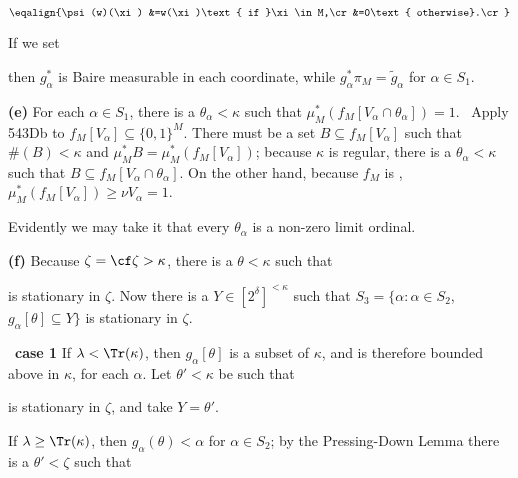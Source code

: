 {$$\eqalign{\psi(w)(\xi)
&=w(\xi)\text{ if }\xi\in M,\cr
&=0\text{ otherwise}.\cr}$$

\noindent If we set


\noindent then $g^*_{\alpha}$ is Baire measurable in each coordinate, while
$g^*_{\alpha}\pi_M=\tilde g_{\alpha}$ for $\alpha\in S_1$.

\medskip

{\bf (e)} For each $\alpha\in S_1$, there is a $\theta_{\alpha}<\kappa$
such that $\mu^*_M(f_M[V_{\alpha}\cap\theta_{\alpha}])=1$.
\Prf\ Apply 543Db to $f_M[V_{\alpha}]\subseteq\{0,1\}^M$.   There
must be a set $B\subseteq f_M[V_{\alpha}]$ such that $\#(B)<\kappa$ and
$\mu_M^*B=\mu_M^*(f_M[V_{\alpha}])$;  because $\kappa$ is regular,
there is a $\theta_{\alpha}<\kappa$ such that
$B\subseteq f_M[V_{\alpha}\cap\theta_{\alpha}]$.   On the other hand,
because $f_M$ is \imp,
$\mu_M^*(f_M[V_{\alpha}])\ge\nu V_{\alpha}=1$.\ \Qed

Evidently we may take it that every $\theta_{\alpha}$ is a non-zero
limit ordinal.

\medskip

{\bf (f)} Because $\zeta=\cf\zeta>\kappa$, there is a $\theta<\kappa$
such that


\noindent is stationary in $\zeta$.   Now there is a
$Y\in[2^{\delta}]^{<\kappa}$ such that
$S_3=\{\alpha:\alpha\in S_2$, $g_{\alpha}[\theta]\subseteq Y\}$ is
stationary in $\zeta$.

\medskip

\Prf\ {\bf case 1} If $\lambda<\Tr(\kappa)$, then $g_{\alpha}[\theta]$
is a subset of $\kappa$, and is therefore bounded above in $\kappa$, for
each $\alpha$.   Let $\theta'<\kappa$ be such that


\noindent is stationary in $\zeta$, and take $Y=\theta'$.

\medskip

 If $\lambda\ge\Tr(\kappa)$, then
$g_{\alpha}(\theta)<\alpha$ for $\alpha\in S_2$;
by the Pressing-Down Lemma there is a $\theta'<\zeta$ such that


}
